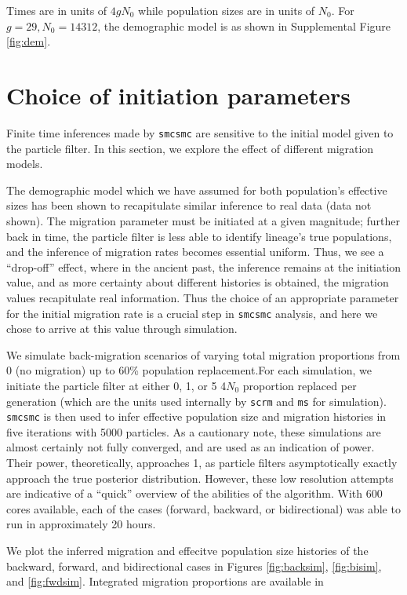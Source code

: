 \documentclass{article}
\begin{document}
Times are in units of $4gN_0$ while population sizes are in units of $N_0$. For $g=29, N_0 = 14312$, the demographic model is as shown in Supplemental Figure \ref{fig:dem}.  

\section{Choice of initiation parameters} \label{minit}

Finite time inferences made by {\tt smcsmc} are sensitive to the initial model given to the particle filter. In this section, we explore the effect of different migration models.  

The demographic model which we have assumed for both population's effective sizes has been shown to recapitulate similar inference to real data (data not shown). The migration parameter must be initiated at a given magnitude; further back in time, the particle filter is less able to identify lineage's true populations, and the inference of migration rates becomes essential uniform. Thus, we see a ``drop-off'' effect, where in the ancient past, the inference remains at the initiation value, and as more certainty about different histories is obtained, the migration values recapitulate real information. Thus the choice of an appropriate parameter for the initial migration rate is a crucial step in {\tt smcsmc} analysis, and here we chose to arrive at this value through simulation.

We simulate back-migration scenarios of varying total migration proportions from 0 (no migration) up to 60\% population replacement.For each simulation, we initiate the particle filter at either 0, 1, or 5 4$N_0$ proportion replaced per generation (which are the units used internally by {\tt scrm} and {\tt ms} for simulation).  {\tt smcsmc} is then used to infer effective population size and migration histories in five iterations with 5000 particles. As a cautionary note, these simulations are almost certainly not fully converged, and are used as an indication of power. Their power, theoretically, approaches 1, as particle filters asymptotically exactly approach the true posterior distribution. However, these low resolution attempts are indicative of a ``quick'' overview of the abilities of the algorithm. With 600 cores available, each of the cases (forward, backward, or bidirectional) was able to run in approximately 20 hours. 

We plot the inferred migration and effecitve population size histories of the backward, forward, and bidirectional cases in Figures \ref{fig:backsim}, \ref{fig:bisim}, and \ref{fig:fwdsim}. Integrated migration proportions are available in 
\end{document}
